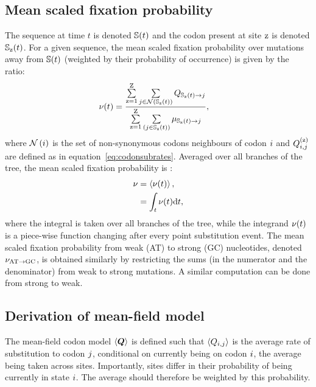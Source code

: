 \subsection{Mean scaled fixation probability}
\label{subsec:fixation-bias}
The sequence at time $t$ is denoted $\mathbb{S}(t)$ and the \gls{codon} present at site $\text{z}$ is denoted $\mathbb{S}_{\text{z}}(t)$.
For a given sequence, the mean scaled fixation probability over mutations away from $\mathbb{S}(t)$ (weighted by their probability of occurrence) is given by the ratio:
\begin{align}
    \nu (t) & = \dfrac{ \sum\limits_{\text{z}=1}^{\text{Z}} \sum\limits_{{j} \in \mathcal{N} \left ( \mathbb{S}_{\text{z}}(t) \right)} Q_{\mathbb{S}_{\text{z}}(t) \to {j}}}{ \sum\limits_{\text{z}=1}^{\text{Z}} \sum\limits_{\left ( {j} \in \mathbb{S}_{\text{z}}(t) \right)} \mu_{\mathbb{S}_{\text{z}}(t) \to {j}}},
\end{align}
where $\mathcal{N}\left({i}\right)$ is the set of \gls{non-synonymous} \glspl{codon} neighbours of \gls{codon} ${i}$ and $Q_{{i}, {j}}^{(\text{z})}$ are defined as in equation~\ref{eq:codonsubrates}.
Averaged over all branches of the tree, the mean scaled fixation probability is :
\begin{align}
    \nu & = \left\langle \nu (t) \right\rangle, \\
    & = \int_{t} \nu (t) \text{d} t,
\end{align}
where the integral is taken over all branches of the tree, while the integrand $\nu (t)$ is a piece-wise function changing after every point \gls{substitution} event.
The mean scaled fixation probability from weak (AT) to strong (GC) nucleotides, denoted $\nu_{\text{AT} \rightarrow \text{GC}}$, is obtained similarly by restricting the sums (in the numerator and the denominator) from weak to strong mutations.
A similar computation can be done from strong to weak.

\subsection{Derivation of mean-field model}
\label{subsec:mean-field-derivation}
The mean-field \gls{codon} model $\left\langle \bm{Q} \right\rangle$ is defined such that $\left\langle Q_{{i}, {j}} \right\rangle$ is the average rate of \gls{substitution} to \gls{codon} ${j}$, conditional on currently being on \gls{codon} ${i}$, the average being taken across sites.
Importantly, sites differ in their probability of being currently in state ${i}$.
The average should therefore be weighted by this probability.

